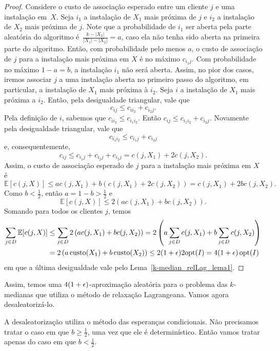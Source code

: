 \begin{proof}
Considere o custo de associação esperado entre um cliente $j$ e uma instalação em~$X$. Seja $i_1$ a instalação de $X_1$ mais próxima de $j$ e $i_2$ a instalação de $X_2$ mais próxima de $j$. Note que a probabilidade de $i_1$ ser aberta pela parte aleatória do algoritmo é~$\frac{k - |X_2|}{|X_1| - |X_2|} = a$, caso ela não tenha sido aberta na primeira parte do algoritmo. Então, com probabilidade pelo menos $a$, o custo de associação de $j$ para a instalação mais próxima em $X$ é no máximo $c_{i_1j}$. Com probabilidade no máximo $1 - a = b$, a instalação $i_1$ não será aberta. Assim, no pior dos casos, iremos associar $j$ a uma instalação aberta no primeiro passo do algoritmo, em particular, a instalação de $X_1$ mais próxima à $i_2$. Seja $i$ a instalação  de $X_1$ mais próxima a $i_2$. Então, pela desigualdade triangular, vale que
\[c_{ij} \leq c_{ii_2} + c_{i_2j}.\]
Pela definição de $i$, sabemos que $c_{ii_2} \leq c_{i_1i_2}$. Então \(c_{ij} \leq c_{i_1i_2} + c_{i_2j}\). Novamente pela desigualdade triangular, vale que 
\[c_{i_1i_2} \leq c_{i_1j} + c_{i_2j}\]
e, consequentemente,
\[c_{ij} \leq c_{i_1j} + c_{i_2j} + c_{i_2j} = c(j,X_1) + 2 c(j,X_2).\]
Assim, o custo de associação esperado de $j$ para a instalação mais próxima em $X$ é
\[\mathbb{E}[c(j,X)] \leq a c\left(j,X_1\right) + b\left(c(j,X_1) + 2 c(j,X_2)\right) = c(j,X_1) + 2bc(j,X_2).\] 
Como $b < \frac{1}{2}$, então $a = 1 - b > \frac{1}{2}$ e 
\[\mathbb{E}[c(j,X)] \leq 2\left( a c(j,X_1) + bc(j,X_2)\right).\]
Somando para todos os clientes $j$, temos
\begin{subequations}
    \begin{align*}
        \sum_{j \in D}\mathbb{E}[c(j,X)] &\leq \sum_{j \in D}2\left( a c(j,X_1) + bc(j,X_2)\right) = 2\left(a \sum_{j\in D} c(j,X_1) + b \sum_{j \in D} c(j,X_2)\right) \\
        & = 2\left( a\, \mathrm{custo}(X_1) + b\, \mathrm{custo}(X_2)\right) \leq 2 (1 + \epsilon) 2 \mathrm{opt}(I) = 4(1+\epsilon)\, \mathrm{opt}(I)
    \end{align*}
\end{subequations}
em que a última desigualdade vale pelo Lema~\ref{k-median_relLag_lema1}.
\end{proof}

Assim, temos uma $4(1 + \epsilon)$-aproximação aleatória para o problema das $k$-medianas que utiliza o método de relaxação Lagrangeana. Vamos agora desaleatorizá-lo.

A desaleatorização utiliza o método das esperanças condicionais. Não precisamos tratar o caso em que $b \geq \frac{1}{2}$, uma vez que ele é determinístico. Então vamos tratar apenas do caso em que $b < \frac{1}{2}$.

